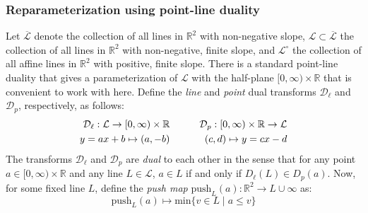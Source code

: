 \documentclass{siamart190516}
\begin{document}

\subsubsection*{Reparameterization using point-line duality}\label{sec:fibered_barcode_reparam}
Let $\overline{\mathcal{L}}$ denote the collection of all lines in $\mathbb{R}^2$ with non-negative slope, $\mathcal{L} \subset \overline{\mathcal{L}}$ the collection of all lines in $\mathbb{R}^2$ with non-negative, finite slope, and $\mathcal{L}^\circ$ the collection of all affine lines in $\mathbb{R}^2$ with positive, finite slope. There is a standard point-line duality that gives a parameterization of $\mathcal{L}$ with the half-plane $[0, \infty) \times \mathbb{R}$ that is convenient to work with here. Define the \emph{line} and \emph{point} dual transforms $\mathcal{D}_{\ell}$ and $\mathcal{D}_p$, respectively, as follows: 
\begin{equation}
	\begin{aligned}
\mathcal{D}_{\ell}: \mathcal{L} \rightarrow[0, \infty) \times \mathbb{R} & \quad \hfill \quad & \mathcal{D}_{p}:[0, \infty) \times \mathbb{R} \rightarrow \mathcal{L} \\
y=a x+b \mapsto(a,-b) &\quad \hfill \quad & (c, d) \mapsto y=c x-d
\end{aligned}
\end{equation}
The transforms $\mathcal{D}_{\ell}$ and $\mathcal{D}_p$ are \emph{dual} to each other in the sense that for any point $a \in [0, \infty) \times \mathbb{R}$ and any line $L \in \mathcal{L}$, $a \in L$ if and only if $D_\ell(L) \in D_{p}(a)$. Now, for some fixed line $L$, define  the \emph{push map} $\mathrm{push}_L(a):  \mathbb{R}^2 \to L \cup \infty$ as: 
\begin{equation}
	\mathrm{push}_L(a) \mapsto \mathrm{min}\{ v \in L \mid a \leq v \}
\end{equation}
\end{document}
